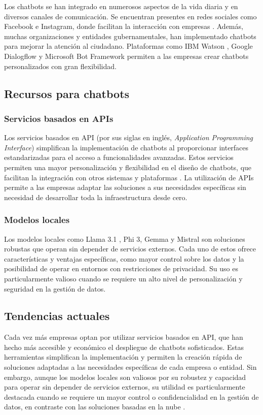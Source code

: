 Los chatbots se han integrado en numerosos aspectos de la vida diaria y en diversos canales de comunicación. Se encuentran presentes en redes sociales como Facebook e Instagram, donde facilitan la interacción con empresas \cite{facebook-workplace-bots}. Además, muchas organizaciones y entidades gubernamentales, han implementado chatbots para mejorar la atención al ciudadano. Plataformas como IBM Watson \cite{ibm-watson}, Google Dialogflow \cite{google-dialogflow} y Microsoft Bot Framework \cite{microsoft-botframework} permiten a las empresas crear chatbots personalizados con gran flexibilidad.

\subsection{Recursos para chatbots}

\subsubsection{Servicios basados en APIs}
Los servicios basados en API (por sus siglas en inglés, \textit{Application Programming Interface}) simplifican la implementación de chatbots al proporcionar interfaces estandarizadas para el acceso a funcionalidades avanzadas. Estos servicios permiten una mayor personalización y flexibilidad en el diseño de chatbots, que facilitan la integración con otros sistemas y plataformas \cite{openai-api}. La utilización de APIs permite a las empresas adaptar las soluciones a sus necesidades específicas sin necesidad de desarrollar toda la infraestructura desde cero.


\newpage
\subsubsection{Modelos locales}
Los modelos locales como Llama 3.1 \cite{meta-ai-llama}, Phi 3, Gemma \cite{google-deepmind-gemma} y Mistral \cite{mistral-ai} son soluciones robustas que operan sin depender de servicios externos. Cada uno de estos ofrece características y ventajas específicas, como mayor control sobre los datos y la posibilidad de operar en entornos con restricciones de privacidad. Su uso es particularmente valioso cuando se requiere un alto nivel de personalización y seguridad en la gestión de datos.


\subsection{Tendencias actuales}
Cada vez más empresas optan por utilizar servicios basados en API, que han hecho más accesible y económico el despliegue de chatbots sofisticados. Estas herramientas simplifican la implementación y permiten la creación rápida de soluciones adaptadas a las necesidades específicas de cada empresa o entidad. Sin embargo, aunque los modelos locales son valiosos por su robustez y capacidad para operar sin depender de servicios externos, su utilidad es particularmente destacada cuando se requiere un mayor control o confidencialidad en la gestión de datos, en contraste con las soluciones basadas en la nube \cite{ibm-on-premise-cloud}.


